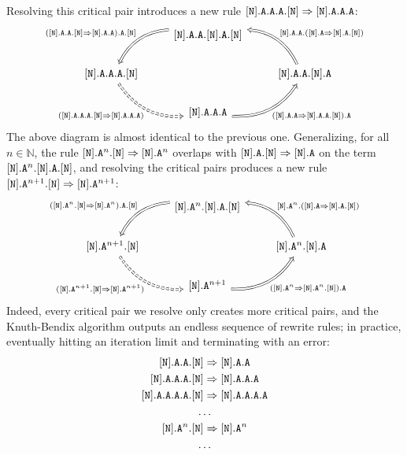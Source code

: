 \documentclass[../generics]{subfiles}
\begin{document}
Resolving this critical pair introduces a new rule $[\texttt{N}].\texttt{A}.\texttt{A}.\texttt{A}.[\texttt{N}]\Rightarrow[\texttt{N}].\texttt{A}.\texttt{A}.\texttt{A}$:
\[
\FourLoopDerived%
{\protosym{N}.\texttt{A}.\texttt{A}.\protosym{N}.\texttt{A}.\protosym{N}}%
{\protosym{N}.\texttt{A}.\texttt{A}.\texttt{A}.\protosym{N}}%
{\protosym{N}.\texttt{A}.\texttt{A}.\texttt{A}}%
{\protosym{N}.\texttt{A}.\texttt{A}.\protosym{N}.\texttt{A}}%
{(\protosym{N}.\texttt{A}.\texttt{A}.\protosym{N}\Rightarrow\protosym{N}.\texttt{A}.\texttt{A}).\texttt{A}.\protosym{N}}%
{(\protosym{N}.\texttt{A}.\texttt{A}.\texttt{A}.\protosym{N}\Rightarrow\protosym{N}.\texttt{A}.\texttt{A}.\texttt{A})}%
{(\protosym{N}.\texttt{A}.\texttt{A}\Rightarrow\protosym{N}.\texttt{A}.\texttt{A}.\protosym{N}).\texttt{A}}%
{\protosym{N}.\texttt{A}.\texttt{A}.(\protosym{N}.\texttt{A}\Rightarrow\protosym{N}.\texttt{A}.\protosym{N})}
\]
The above diagram is almost identical to the previous one. Generalizing, for all $n\in\mathbb{N}$, the rule $[\texttt{N}].\texttt{A}^n.[\texttt{N}]\Rightarrow[\texttt{N}].\texttt{A}^n$ overlaps with $[\texttt{N}].\texttt{A}.[\texttt{N}]\Rightarrow[\texttt{N}].\texttt{A}$ on the term $[\texttt{N}].\texttt{A}^n.[\texttt{N}].\texttt{A}.[\texttt{N}]$, and resolving the critical pairs produces a new rule $[\texttt{N}].\texttt{A}^{n+1}.[\texttt{N}]\Rightarrow[\texttt{N}].\texttt{A}^{n+1}$:
\[
\FourLoopDerived%
{\protosym{N}.\texttt{A}^n.\protosym{N}.\texttt{A}.\protosym{N}}%
{\protosym{N}.\texttt{A}^{n+1}.\protosym{N}}%
{\protosym{N}.\texttt{A}^{n+1}}%
{\protosym{N}.\texttt{A}^n.\protosym{N}.\texttt{A}}%
{(\protosym{N}.\texttt{A}^n.\protosym{N}\Rightarrow\protosym{N}.\texttt{A}^n).\texttt{A}.\protosym{N}}%
{(\protosym{N}.\texttt{A}^{n+1}.\protosym{N}\Rightarrow\protosym{N}.\texttt{A}^{n+1})}%
{(\protosym{N}.\texttt{A}^n\Rightarrow\protosym{N}.\texttt{A}^n.\protosym{N}).\texttt{A}}%
{\protosym{N}.\texttt{A}^n.(\protosym{N}.\texttt{A}\Rightarrow\protosym{N}.\texttt{A}.\protosym{N})}
\]
Indeed, every critical pair we resolve only creates more critical pairs, and the Knuth-Bendix algorithm outputs an endless sequence of rewrite rules; in practice, eventually hitting an iteration limit and terminating with an error:
\begin{gather*}
\protosym{N}.\texttt{A}.\texttt{A}.\protosym{N}\Rightarrow\protosym{N}.\texttt{A}.\texttt{A}\\
\protosym{N}.\texttt{A}.\texttt{A}.\texttt{A}.\protosym{N}\Rightarrow\protosym{N}.\texttt{A}.\texttt{A}.\texttt{A}\\
\protosym{N}.\texttt{A}.\texttt{A}.\texttt{A}.\texttt{A}.\protosym{N}\Rightarrow\protosym{N}.\texttt{A}.\texttt{A}.\texttt{A}.\texttt{A}\\
\ldots\\
\protosym{N}.\texttt{A}^n.\protosym{N}\Rightarrow\protosym{N}.\texttt{A}^n\\
\ldots
\end{gather*}
\end{document}
